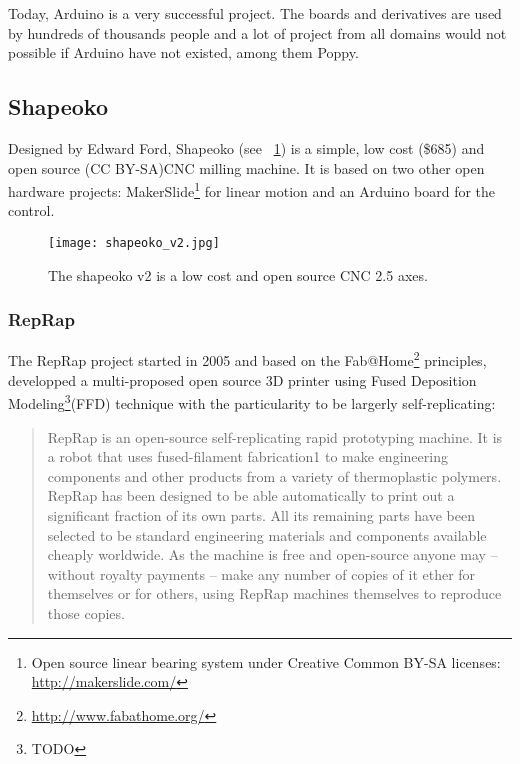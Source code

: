 Today, Arduino is a very successful project. The boards and derivatives are used by hundreds of thousands people and a lot of project from all domains would not possible if Arduino have not existed, among them Poppy.


\subsection{Shapeoko}

Designed by Edward Ford, Shapeoko (see \figurename~\ref{fig:shapeoko}) is a simple, low cost (\$685) and open source (CC BY-SA)CNC milling machine. It is based on two other open hardware projects: MakerSlide\footnote{Open source linear bearing system under Creative Common BY-SA licenses: \url{http://makerslide.com/}} for linear motion and an Arduino board for the control.

\begin{figure}[]
    \begin{center}
        \texttt{[image: shapeoko\_v2.jpg]}
    \end{center}
    \caption{The shapeoko v2 is a low cost and open source CNC 2.5 axes.}
    \label{fig:shapeoko}
\end{figure}

\subsubsection{RepRap} %

The RepRap project started in 2005 and based on the Fab@Home\footnote{\url{http://www.fabathome.org/}} principles, developped a multi-proposed open source 3D printer using Fused Deposition Modeling\footnote{TODO}(FFD) technique with the particularity to be largerly self-replicating:

\begin{quotation}
    RepRap is an open-source self-replicating rapid prototyping machine. It is a robot that uses fused-filament fabrication1 to make engineering components and other products from a variety of thermoplastic polymers. RepRap has been designed to be able automatically to print out a significant fraction of its own parts. All its remaining parts have been selected to be standard engineering materials and components available cheaply worldwide. As the machine is free and open-source anyone may – without royalty payments – make any number of copies of it ether for themselves or for others, using RepRap machines themselves to reproduce those copies.

\end{quotation}


